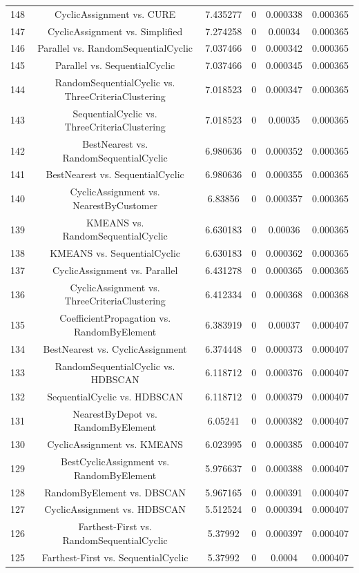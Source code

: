 \documentclass[a4paper,10pt]{article}
\begin{document}
\begin{landscape}
\begin{table}[!htp]
\begin{tabular}{cccccc}
148&CyclicAssignment vs. CURE&7.435277&0&0.000338&0.000365\\
147&CyclicAssignment vs. Simplified&7.274258&0&0.00034&0.000365\\
146&Parallel vs. RandomSequentialCyclic&7.037466&0&0.000342&0.000365\\
145&Parallel vs. SequentialCyclic&7.037466&0&0.000345&0.000365\\
144&RandomSequentialCyclic vs. ThreeCriteriaClustering&7.018523&0&0.000347&0.000365\\
143&SequentialCyclic vs. ThreeCriteriaClustering&7.018523&0&0.00035&0.000365\\
142&BestNearest vs. RandomSequentialCyclic&6.980636&0&0.000352&0.000365\\
141&BestNearest vs. SequentialCyclic&6.980636&0&0.000355&0.000365\\
140&CyclicAssignment vs. NearestByCustomer&6.83856&0&0.000357&0.000365\\
139&KMEANS vs. RandomSequentialCyclic&6.630183&0&0.00036&0.000365\\
138&KMEANS vs. SequentialCyclic&6.630183&0&0.000362&0.000365\\
137&CyclicAssignment vs. Parallel&6.431278&0&0.000365&0.000365\\
136&CyclicAssignment vs. ThreeCriteriaClustering&6.412334&0&0.000368&0.000368\\
135&CoefficientPropagation vs. RandomByElement&6.383919&0&0.00037&0.000407\\
134&BestNearest vs. CyclicAssignment&6.374448&0&0.000373&0.000407\\
133&RandomSequentialCyclic vs. HDBSCAN&6.118712&0&0.000376&0.000407\\
132&SequentialCyclic vs. HDBSCAN&6.118712&0&0.000379&0.000407\\
131&NearestByDepot vs. RandomByElement&6.05241&0&0.000382&0.000407\\
130&CyclicAssignment vs. KMEANS&6.023995&0&0.000385&0.000407\\
129&BestCyclicAssignment vs. RandomByElement&5.976637&0&0.000388&0.000407\\
128&RandomByElement vs. DBSCAN&5.967165&0&0.000391&0.000407\\
127&CyclicAssignment vs. HDBSCAN&5.512524&0&0.000394&0.000407\\
126&Farthest-First vs. RandomSequentialCyclic&5.37992&0&0.000397&0.000407\\
125&Farthest-First vs. SequentialCyclic&5.37992&0&0.0004&0.000407\\

\end{tabular}
\end{table}
\end{landscape}
\end{document}
